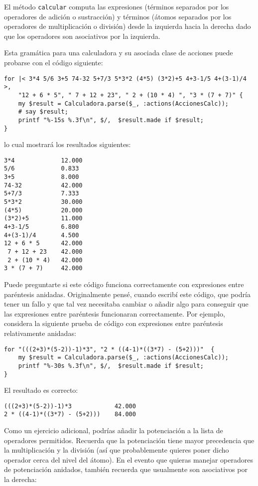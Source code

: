 El método {\tt calcular} computa las expresiones (términos
separados por los operadores de adición o sustracción) y
términos (átomos separados por los operadores de multiplicación
o división) desde la izquierda hacia la derecha dado que los
operadores son asociativos por la izquierda.

Esta gramática para una calculadora y su  asociada clase de acciones 
puede probarse con el código siguiente:

\begin{verbatim}
for |< 3*4 5/6 3+5 74-32 5+7/3 5*3*2 (4*5) (3*2)+5 4+3-1/5 4+(3-1)/4 >,
    "12 + 6 * 5", " 7 + 12 + 23", " 2 + (10 * 4) ", "3 * (7 + 7)" { 
    my $result = Calculadora.parse($_, :actions(AccionesCalc));
    # say $result;
    printf "%-15s %.3f\n", $/,  $result.made if $result;
}
\end{verbatim}

lo cual mostrará los resultados siguientes:

\begin{verbatim}
3*4             12.000
5/6             0.833
3+5             8.000
74-32           42.000
5+7/3           7.333
5*3*2           30.000
(4*5)           20.000
(3*2)+5         11.000
4+3-1/5         6.800
4+(3-1)/4       4.500
12 + 6 * 5      42.000
 7 + 12 + 23    42.000
 2 + (10 * 4)   42.000
3 * (7 + 7)     42.000
\end{verbatim}

Puede preguntarte si este código funciona correctamente con
expresiones entre paréntesis anidadas. Originalmente pensé,
cuando escribí este código, que podría tener un fallo y que tal vez
necesitaba cambiar o añadir algo para conseguir que las expresiones
entre paréntesis funcionaran correctamente. Por ejemplo, considera
la siguiente prueba de código con expresiones entre paréntesis 
relativamente anidadas:

\begin{verbatim}
for "(((2+3)*(5-2))-1)*3", "2 * ((4-1)*((3*7) - (5+2)))"  { 
    my $result = Calculadora.parse($_, :actions(AccionesCalc));
    printf "%-30s %.3f\n", $/,  $result.made if $result;
}
\end{verbatim}

El resultado es correcto:
\begin{verbatim}
(((2+3)*(5-2))-1)*3            42.000
2 * ((4-1)*((3*7) - (5+2)))    84.000
\end{verbatim}

Como un ejercicio adicional, podrías añadir la potenciación a la lista 
de operadores permitidos. Recuerda que la potenciación tiene mayor precedencia
que la multiplicación y la división (así que probablemente quieres
poner dicho operador cerca del nivel del átomo). En el evento que
quieras manejar operadores de potenciación anidados, también recuerda
que usualmente son asociativos por la derecha:

